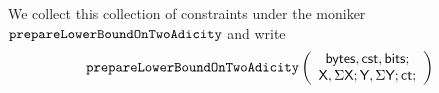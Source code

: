 \noindent We collect this collection of constraints under the moniker $\texttt{prepareLowerBoundOnTwoAdicity}$ and write
\[
	\texttt{prepareLowerBoundOnTwoAdicity}
	\left(
	\begin{array}{c}
	\textsf{bytes},
	\textsf{cst},
	\textsf{bits}; \\
	\textsf{X},
	\Sigma\textsf{X};
	\textsf{Y},
	\Sigma\textsf{Y};
	\textsf{ct}{};
	\end{array}
	\right)
\]